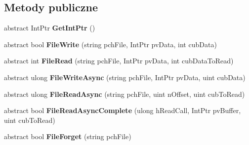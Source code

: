 \subsection*{Metody publiczne}
\begin{DoxyCompactItemize}
\item 
\mbox{\label{class_valve_1_1_steamworks_1_1_i_steam_remote_storage_a2823b5a9f48055fb48e53a9795ac22cb}} 
abstract Int\+Ptr {\bfseries Get\+Int\+Ptr} ()
\item 
\mbox{\label{class_valve_1_1_steamworks_1_1_i_steam_remote_storage_abe856b4ccbc1b51c34a68ddb4494edcc}} 
abstract bool {\bfseries File\+Write} (string pch\+File, Int\+Ptr pv\+Data, int cub\+Data)
\item 
\mbox{\label{class_valve_1_1_steamworks_1_1_i_steam_remote_storage_a135c82b67bf3104d40b213e460def316}} 
abstract int {\bfseries File\+Read} (string pch\+File, Int\+Ptr pv\+Data, int cub\+Data\+To\+Read)
\item 
\mbox{\label{class_valve_1_1_steamworks_1_1_i_steam_remote_storage_a053601e8f71636936f0e3f2423f76976}} 
abstract ulong {\bfseries File\+Write\+Async} (string pch\+File, Int\+Ptr pv\+Data, uint cub\+Data)
\item 
\mbox{\label{class_valve_1_1_steamworks_1_1_i_steam_remote_storage_a167de1c6bafb97cfa803f1c34cf4a399}} 
abstract ulong {\bfseries File\+Read\+Async} (string pch\+File, uint n\+Offset, uint cub\+To\+Read)
\item 
\mbox{\label{class_valve_1_1_steamworks_1_1_i_steam_remote_storage_a2b601bdc16eda3ed9487a5ba3f061de4}} 
abstract bool {\bfseries File\+Read\+Async\+Complete} (ulong h\+Read\+Call, Int\+Ptr pv\+Buffer, uint cub\+To\+Read)
\item 
\mbox{\label{class_valve_1_1_steamworks_1_1_i_steam_remote_storage_a4286e46a677dedf1807dafc53823a579}} 
abstract bool {\bfseries File\+Forget} (string pch\+File)

\end{DoxyCompactItemize}
